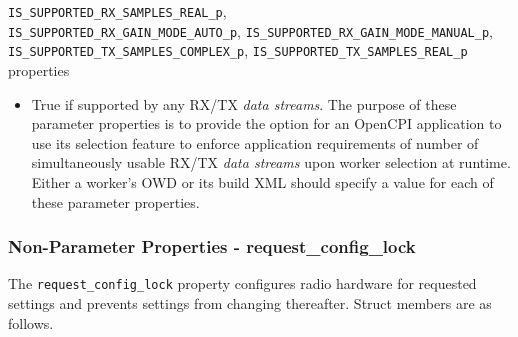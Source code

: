 \documentclass{article}
\begin{document}
\begin{itemize}
      \verb+IS_SUPPORTED_RX_SAMPLES_REAL_p+, \\
      \verb+IS_SUPPORTED_RX_GAIN_MODE_AUTO_p+,
      \verb+IS_SUPPORTED_RX_GAIN_MODE_MANUAL_p+, \\
      \verb+IS_SUPPORTED_TX_SAMPLES_COMPLEX_p+,
      \verb+IS_SUPPORTED_TX_SAMPLES_REAL_p+ properties
      \begin{itemize}
        \item True if supported by any RX/TX \textit{data streams}.
          The purpose of these parameter properties is to provide the option for
          an OpenCPI
          application to use its selection feature\cite{ocpi_app_guide} to
          enforce
          application requirements of number of simultaneously usable
          RX/TX \textit{data streams} upon worker
          selection at runtime.
          Either a worker's OWD or its build XML
          should specify a value for each of these parameter properties.
      \end{itemize}
  \end{itemize}

\pagebreak

\subsubsection{Non-Parameter Properties - request\_config\_lock}

  The \verb+request_config_lock+ property configures radio hardware for
  requested settings and prevents settings from changing thereafter. Struct
  members are
  as follows.
\end{document}

